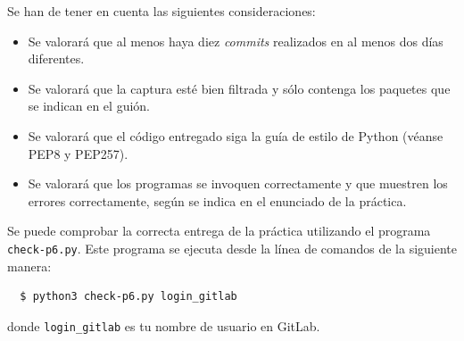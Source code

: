 \documentclass[a4paper,11pt]{article}
\begin{document}
Se han de tener en cuenta las siguientes consideraciones:
\begin{itemize}
  \item Se valorará que al menos haya diez \emph{commits} realizados en al menos dos días diferentes.
  \item Se valorará que la captura esté bien filtrada y sólo contenga los paquetes que se indican en el guión.
  \item Se valorará que el código entregado siga la guía de estilo de Python (véanse PEP8 y PEP257).
  \item Se valorará que los programas se invoquen correctamente y que muestren los errores correctamente, según se indica en el enunciado de la práctica.
\end{itemize}

Se puede comprobar la correcta entrega de la práctica utilizando el programa \texttt{check-p6.py}. Este programa se ejecuta desde la línea de comandos de la siguiente manera:
\begin{verbatim}
  $ python3 check-p6.py login_gitlab
\end{verbatim}


donde \texttt{login\_gitlab} es tu nombre de usuario en GitLab.


%
%
\end{document}
